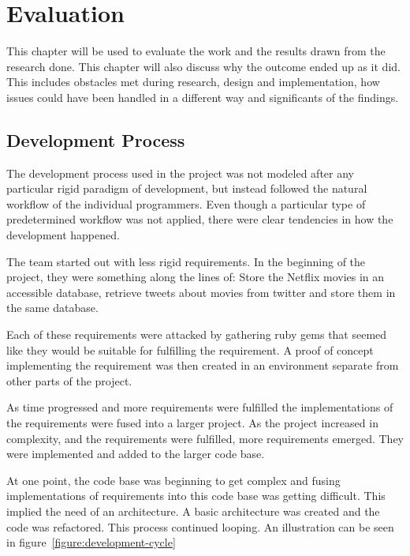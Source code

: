 
\chapter{Evaluation}

\minitoc

This chapter will be used to evaluate the work and the results drawn from the research done. This chapter will also discuss why the outcome ended up as it did. This includes obstacles met during research, design and implementation, how issues could have been handled in a different way and significants of the findings.

\clearpage


\section{Development Process}
The development process used in the project was not modeled after any particular rigid paradigm of development, but instead followed the natural workflow of the individual programmers. Even though a particular type of predetermined workflow was not applied, there were clear tendencies in how the development happened.

The team started out with less rigid requirements. In the beginning of the project, they were something along the lines of: Store the Netflix movies in an accessible database, retrieve tweets about movies from twitter and store them in the same database.

Each of these requirements were attacked by gathering ruby gems that seemed like they would be suitable for fulfilling the requirement. A proof of concept implementing the requirement was then created in an environment separate from other parts of the project.

As time progressed and more requirements were fulfilled the implementations of the requirements were fused into a larger project. As the project increased in complexity, and the requirements were fulfilled, more requirements emerged. They were implemented and added to the larger code base.

At one point, the code base was beginning to get complex and fusing implementations of requirements into this code base was getting difficult. This implied the need of an architecture. A basic architecture was created and the code was refactored. This process continued looping. An illustration can be seen in figure~\ref{figure:development-cycle}

